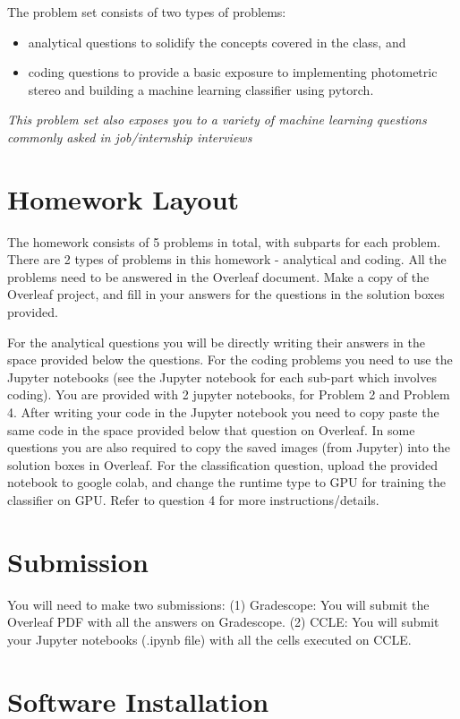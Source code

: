 \documentclass[answers]{exam}
\begin{document}
The problem set consists of two types of problems: 
\begin{itemize}
    \item analytical questions to solidify the concepts covered in the class, and
    \item coding questions to provide a basic exposure to implementing photometric stereo and building a machine learning classifier using pytorch.
\end{itemize}

\emph{This problem set also exposes you to a variety of machine learning questions commonly asked in job/internship interviews}


\section*{Homework Layout}
The homework consists of 5 problems in total, with subparts for each problem. There are 2 types of problems in this homework - analytical and coding. All the problems need to be answered in the Overleaf document. Make a copy of the Overleaf project, and fill in your answers for the questions in the solution boxes provided. 

For the analytical questions you will be directly writing their answers in the space provided below the questions. For the coding problems you need to use the Jupyter notebooks (see the Jupyter notebook for each sub-part which involves coding). You are provided with 2 jupyter notebooks, for Problem 2 and Problem 4. After writing your code in the Jupyter notebook you need to copy paste the same code in the space provided below that question on Overleaf. In some questions you are also required to copy the saved images (from Jupyter) into the solution boxes in Overleaf. For the classification question, upload the provided notebook to google colab, and change the runtime type to GPU for training the classifier on GPU. Refer to question 4 for more instructions/details. 

\section*{Submission}

You will need to make two submissions: (1) Gradescope: You will submit the Overleaf PDF with all the answers on Gradescope. (2) CCLE: You will submit your Jupyter notebooks (.ipynb file) with all the cells executed on CCLE. 

\section*{Software Installation}
\end{document}
